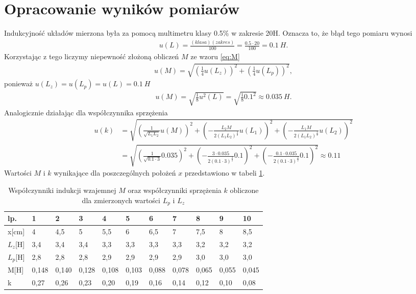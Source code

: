 \documentclass{article}
\begin{document}
 \section{Opracowanie wyników pomiarów}


Indukcyjność układów mierzona była za pomocą multimetru klasy
0.5\% w zakresie 20H. Oznacza to, że błąd tego pomiaru wynosi
\begin{align*}
    u(L) = \frac{(klasa)(zakres)}{100} = \frac{0.5 \cdot 20}{100} = \SI{0.1}{H}.
\end{align*}
Korzystając z tego liczymy niepewność złożoną obliczeń $M$ ze wzoru
\eqref{eq:M}
\begin{align*}
    u(M) = \sqrt{\left(\frac{1}{4}u(L_z)\right)^2 + 
    \left(\frac{1}{4}u(L_p)\right)^2},
\end{align*}
ponieważ $u(L_z) = u(L_p) = u(L) = \SI{0.1}{H}$
\begin{align*}
    u(M) = \sqrt{\frac{1}{8}u^2(L)} = \sqrt{\frac{1}{8}0.1^2} \approx \SI{0.035}{H}.
\end{align*}
Analogicznie działając dla współczynnika sprzężenia
\begin{align*}
    u(k) &= \sqrt{\left(\frac{1}{\sqrt{L_1L_2}}u(M)\right)^2 +
    \left(-\frac{L_2M}{2(L_1L_2)^{\frac{3}{2}}}u(L_1)\right)^2 +
    \left(-\frac{L_1M}{2(L_1L_2)^{\frac{3}{2}}}u(L_2)\right)^2}\\
    &= \sqrt{\left(\frac{1}{\sqrt{0.1 \cdot 3}}0.035\right)^2 +
    \left(-\frac{3 \cdot 0.035}{2(0.1 \cdot 3)^{\frac{3}{2}}}0.1\right)^2 +
    \left(-\frac{0.1 \cdot 0.035}{2(0.1 \cdot 3)^{\frac{3}{2}}}0.1\right)^2} \approx 0.11
\end{align*}
Wartości $M$ i $k$ wynikające dla poszczególnych położeń $x$
przedstawiono w tabeli \ref{tab:MiK}.
\begin{table}[h]
\centering
\begin{tabular}{|l|l|l|l|l|l|l|l|l|l|l|}
\hline
lp.       & 1     & 2     & 3     & 4     & 5     & 6     & 7     & 8     & 9     & 10    \\ \hline
x{[}cm{]} & 4     & 4,5   & 5     & 5,5   & 6     & 6,5   & 7     & 7,5   & 8     & 8,5   \\ \hline
$L_z${[}H{]} & 3,4   & 3,4   & 3,4   & 3,3   & 3,3   & 3,3   & 3,3   & 3,2   & 3,2   & 3,2   \\ \hline
$L_p${[}H{]} & 2,8   & 2,8   & 2,8   & 2,9   & 2,9   & 2,9   & 2,9   & 3,0   & 3,0   & 3,0   \\ \hline
M{[}H{]}  & 0,148 & 0,140 & 0,128 & 0,108 & 0,103 & 0,088 & 0,078 & 0,065 & 0,055 & 0,045 \\ \hline
k         & 0,27  & 0,26  & 0,23  & 0,20  & 0,19  & 0,16  & 0,14  & 0,12  & 0,10  & 0,08  \\ \hline
\end{tabular}
\caption{Współczynniki indukcji wzajemnej $M$ oraz współczynniki
sprzężenia $k$ obliczone dla zmierzonych wartości $L_p$ i $L_z$}
\label{tab:MiK}
\end{table}
\end{document}
